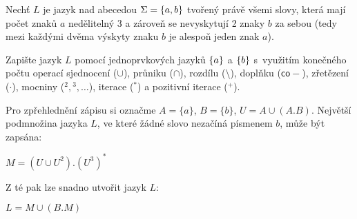 \documentclass[12pt]{ib102}
\begin{document}
\begin{zadani}
Nechť $L$ je jazyk nad abecedou $\Sigma=\{ a,b \}$ tvořený právě všemi slovy,
která mají počet znaků $a$ nedělitelný $3$ a zároveň se nevyskytují 2 znaky $b$
za sebou (tedy mezi každými dvěma výskyty znaku $b$ je alespoň jeden znak $a$).


Zapište jazyk $L$ pomocí jednoprvkových jazyků $\{ a \}$ a $\{ b \}$
s~využitím konečného počtu operací sjednocení ($\cup$), průniku ($\cap$),
rozdílu ($\setminus$), doplňku ($\mathsf{co-}$), zřetězení ($\cdot$),
mocniny (${}^2, {}^3, \ldots$), iterace (${}^*$) a pozitivní iterace (${}^+$).

\end{zadani}

\begin{reseni}
Pro zpřehlednění zápisu si označme $A=\{a\}$, $B=\{b\}$, $U=A \cup (A.B)$.
Největší podmnožina jazyka $L$, ve které žádné slovo nezačíná písmenem $b$, může být zapsána:



\begin{math}
M=(U \cup U^2).(U^3)^*
\end{math}



Z té pak lze snadno utvořit jazyk $L$:


\begin{math}
L=M \cup (B.M)
\end{math}
\end{reseni}
\end{document}
